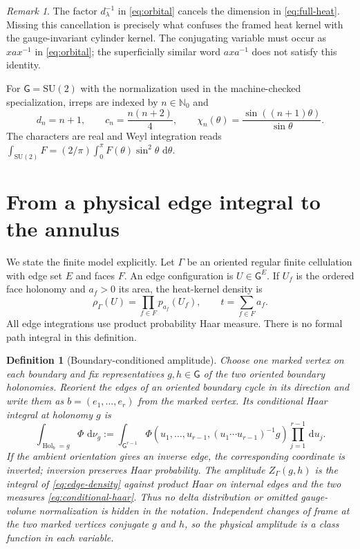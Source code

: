 \documentclass[11pt]{article}
\newtheorem{definition}[theorem]{Definition}
\theoremstyle{remark}
\newtheorem{remark}[theorem]{Remark}
\newcommand{\SU}{\mathrm{SU}(2)}
\newcommand{\G}{\mathsf G}
\newcommand{\dd}{\,\mathrm d}
\begin{document}
\begin{remark}
The factor $d_\lambda^{-1}$ in \eqref{eq:orbital} cancels the dimension in
\eqref{eq:full-heat}.  Missing this cancellation is precisely what confuses the
framed heat kernel with the gauge-invariant cylinder kernel.  The conjugating
variable must occur as $xax^{-1}$ in \eqref{eq:orbital}; the superficially
similar word $axa^{-1}$ does not satisfy this identity.
\end{remark}

For $\G=\SU$ with the normalization used in the machine-checked specialization,
irreps are indexed by $n\in\mathbb N_0$ and
\begin{equation}\label{eq:su2-data}
 d_n=n+1,\qquad c_n=\frac{n(n+2)}4,\qquad
 \chi_n(\theta)=\frac{\sin((n+1)\theta)}{\sin\theta}.
\end{equation}
The characters are real and Weyl integration reads
$\int_{\SU}F=(2/\pi)\int_0^\pi F(\theta)\sin^2\theta\,\dd\theta$.

\section{From a physical edge integral to the annulus}

We state the finite model explicitly.  Let $\Gamma$ be an oriented regular
finite cellulation with edge set $E$ and faces $F$.  An edge configuration is
$U\in\G^E$.  If $U_f$ is the ordered face holonomy and $a_f>0$ its area, the
heat-kernel density is
\begin{equation}\label{eq:edge-density}
 \rho_\Gamma(U)=\prod_{f\in F}p_{a_f}(U_f),\qquad
 t=\sum_{f\in F}a_f.
\end{equation}
All edge integrations use product probability Haar measure.  There is no
formal path integral in this definition.

\begin{definition}[Boundary-conditioned amplitude]\label{def:amplitude}
Choose one marked vertex on each boundary and fix representatives $g,h\in\G$
of the two oriented boundary holonomies.  Reorient the edges of an oriented
boundary cycle in its direction and write them as $b=(e_1,\ldots,e_r)$ from
the marked vertex.  Its conditional Haar integral at holonomy $g$ is
\begin{equation}\label{eq:conditional-haar}
 \int_{\operatorname{Hol}_b=g}\!\Phi\,\dd\nu_g
 :=\int_{\G^{r-1}}
 \Phi\!\left(u_1,\ldots,u_{r-1},
 (u_1\cdots u_{r-1})^{-1}g\right)
 \prod_{j=1}^{r-1}\dd u_j .
\end{equation}
If the ambient orientation gives an inverse edge, the corresponding coordinate
is inverted; inversion preserves Haar probability.  The amplitude
$Z_\Gamma(g,h)$ is the integral of \eqref{eq:edge-density} against product Haar
on internal edges and the two measures \eqref{eq:conditional-haar}.  Thus no
delta distribution or omitted gauge-volume normalization is hidden in the
notation.  Independent changes of frame at the two marked vertices conjugate
$g$ and $h$, so the physical amplitude is a class function in each variable.
\end{definition}
\end{document}
